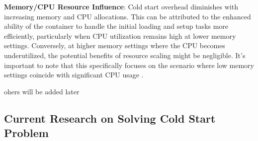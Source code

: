 \textbf{Memory/CPU Resource Influence}: Cold start overhead diminishes with increasing memory and CPU allocations. This can be attributed to the enhanced ability of the container to handle the initial loading and setup tasks more efficiently, particularly when CPU utilization remains high at lower memory settings. Conversely, at higher memory settings where the CPU becomes underutilized, the potential benefits of resource scaling might be negligible. It's important to note that this specifically focuses on the scenario where low memory settings coincide with significant CPU usage \cite{MEHW18}.

ohers will be added later
\subsection{Current Research on Solving Cold Start Problem}









